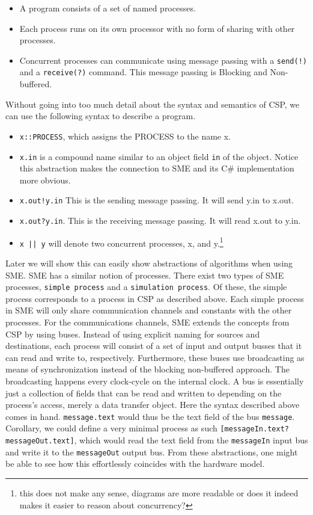 \documentclass[a4paper]{article}
\begin{document}
\begin{itemize}
\item A program consists of a set of named processes.
\item Each process runs on its own processor with no form of sharing with other processes.
\item Concurrent processes can communicate using message passing with a \texttt{send(!)} and a \texttt{receive(?)} command. This message passing is Blocking and Non-buffered.
\end{itemize}
Without going into too much detail about the syntax and semantics of CSP\cite{CSP}, we can use the following syntax to describe a program.
\begin{itemize}
\item \texttt{x::PROCESS}, which assigns the PROCESS to the name x.
\item \texttt{x.in} is a compound name similar to an object field \texttt{in} of the object. Notice this abstraction makes the connection to SME and its C\# implementation more obvious.
\item \texttt{x.out!y.in} This is the sending message passing. It will send y.in to x.out.
\item \texttt{x.out?y.in}. This is the receiving message passing. It will read x.out to y.in.
\item \texttt{x || y} will denote two concurrent processes, x, and y.\footnote{this does not make any sense, diagrams are more readable or does it indeed makes it easier to reason about concurrency?}
\end{itemize}

Later we will show this can easily show abstractions of algorithms when using SME. SME has a similar notion of processes. There exist two types of SME processes, \texttt{simple process} and a \texttt{simulation process}. Of these, the simple process corresponds to a process in CSP as described above. Each simple process in SME will only share communication channels and constants with the other processes. For the communications channels, SME extends the concepts from CSP by using buses. Instead of using explicit naming for sources and destinations, each process will consist of a set of input and output busses that it can read and write to, respectively. Furthermore, these buses use broadcasting as means of synchronization instead of the blocking non-buffered approach.  The broadcasting happens every clock-cycle on the internal clock.
A bus is essentially just a collection of fields that can be read and written to depending on the process's access, merely a data transfer object. Here the syntax described above comes in hand. \texttt{message.text} would thus be the text field of the bus \texttt{message}. Corollary, we could define a very minimal process as such \texttt{[messageIn.text?messageOut.text]}, which would read the text field from the \texttt{messageIn} input bus and write it to the \texttt{messageOut} output bus. From these abstractions, one might be able to see how this effortlessly coincides with the hardware model.
\end{document}
